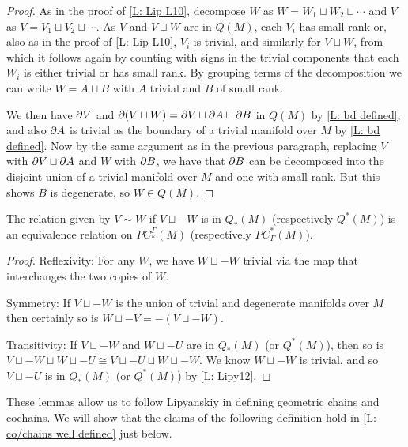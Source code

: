 \begin{proof}
As in the proof of \cref{L: Lip L10}, decompose $W$ as $W = W_1 \sqcup W_2 \sqcup \cdots$ and $V$ as $V = V_1 \sqcup V_2 \sqcup \cdots$. As $V$ and $V \sqcup W$ are in $Q(M)$, each $V_i$ has small rank or, also as in the proof of \cref{L: Lip L10}, $V_i$ is trivial, and similarly for $V \sqcup W$, from which it follows again by counting with signs in the trivial components that each $W_i$ is either trivial or has small rank.
By grouping terms of the decomposition we can write $W = A \sqcup B$ with $A$ trivial and $B$ of small rank.

We then have $\partial V$ and $\partial (V \sqcup W) = \partial V \sqcup \partial A \sqcup \partial B$ in $Q(M)$ by \cref{L: bd defined}, and also $\partial A$ is trivial as the boundary of a trivial manifold over $M$ by \cref{L: bd defined}. Now by the same argument as in the previous paragraph, replacing $V$ with $\partial V \sqcup \partial A$ and $W$ with $\partial B$, we have that $\partial B$ can be decomposed into the disjoint union of a trivial manifold over $M$ and one with small rank. But this shows $B$ is degenerate, so $W \in Q(M)$.
\end{proof}

\begin{lemma}\label{L: cancel Q}
The relation given by $V\sim W$ if $V \sqcup -W$ is in $Q_*(M)$ (respectively $Q^*(M)$) is an equivalence relation on $PC^\Gamma_*(M)$ (respectively $PC_\Gamma^*(M)$).
\end{lemma}
\begin{proof}
Reflexivity: For any $W$, we have $W \sqcup -W$ trivial via the map that interchanges the two copies of $W$.

Symmetry: If $V \sqcup -W$ is the union of trivial and degenerate manifolds over $M$ then certainly so is $W \sqcup -V = -(V \sqcup -W)$.

Transitivity: If $V \sqcup -W$ and $W \sqcup -U$ are in $Q_*(M)$ (or $Q^*(M)$), then so is $V \sqcup -W \sqcup W \sqcup -U \cong V \sqcup -U \sqcup W \sqcup -W$. We know $W \sqcup -W$ is trivial, and so $V \sqcup -U$ is in $Q_*(M)$ (or $Q^*(M)$) by \cref{L: Lipy12}.
\end{proof}

These lemmas allow us to follow Lipyanskiy in defining geometric chains and cochains. We will show that the claims of the following definition hold in \cref{L: co/chains well defined} just below.

